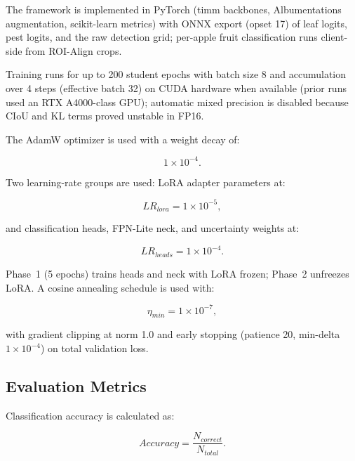 \documentclass[preprint,12pt]{elsarticle}
\begin{document}
The framework is implemented in PyTorch (timm backbones,
Albumentations augmentation, scikit-learn metrics) with ONNX export
(opset 17) of leaf logits, pest logits, and the raw detection grid;
per-apple fruit classification runs client-side from ROI-Align crops.

Training runs for up to 200 student epochs with batch size 8 and
accumulation over 4 steps (effective batch 32) on CUDA hardware when
available (prior runs used an RTX A4000-class GPU); automatic mixed
precision is disabled because CIoU and KL terms proved unstable in
FP16.

The AdamW optimizer is used with a weight decay of:

\begin{equation}
1\times10^{-4}.
\end{equation}

Two learning-rate groups are used: LoRA adapter parameters at:

\begin{equation}
LR_{lora}=1\times10^{-5},
\end{equation}

and classification heads, FPN-Lite neck, and uncertainty weights at:

\begin{equation}
LR_{heads}=1\times10^{-4}.
\end{equation}

Phase~1 (5 epochs) trains heads and neck with LoRA frozen; Phase~2
unfreezes LoRA. A cosine annealing schedule is used with:

\begin{equation}
\eta_{min}=1\times10^{-7},
\end{equation}

with gradient clipping at norm 1.0 and early stopping (patience 20,
min-delta $1\times10^{-4}$) on total validation loss.


\subsection{Evaluation Metrics}

Classification accuracy is calculated as:

\begin{equation}
Accuracy=
\frac{N_{correct}}{N_{total}}.
\end{equation}
\end{document}
